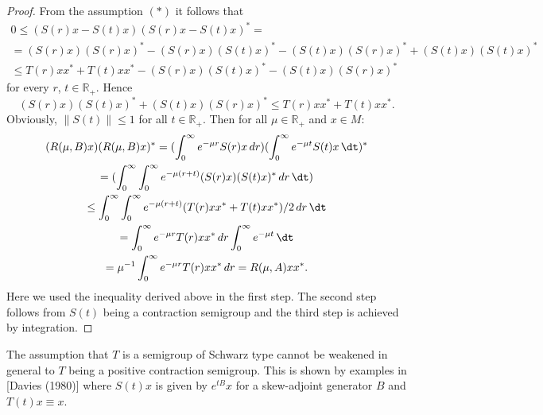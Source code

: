 \begin{proof}
From the assumption $ (*) $ it follows that
\begin{multline*}
	0 	\leq (S(r)x - S(t)x)(S(r)x - S(t)x)^{*} = \\
		 = (S(r)x)(S(r)x)^{*} - (S(r)x)(S(t)x)^{*} 
		 - (S(t)x)(S(r)x)^{*} + (S(t)x)(S(t)x)^{*}  \\
		 \leq T(r)xx^{*} + T(t)xx^{*} - (S(r)x)(S(t)x)^{*} -  
		   (S(t)x)(S(r)x)^{*}
\end{multline*}
for every $ r $, $ t \in \mathbb{R}_{+} $.
Hence
\[
	(S(r)x)(S(t)x)^{*} + (S(t)x)(S(r)x)^{*} \leq T(r)xx^{*} + T(t)xx^{*}.
\]
Obviously, $ \|S(t)\| \leq 1 $ for all $ t \in \mathbb{R}_{+} $.
Then for all $ \mu \in \mathbb{R}_{+} $ and $ x \in M $:
\begin{multline*}
	(R(\mu,B)x)(R(\mu,B)x)^{*} = (\int_{0}^\infty e^{-\mu r}S(r)x \, dr)(\int_{0}^\infty e^{-\mu t}S(t)x \, 				\dt)^{*}   \\
	= (\int_{0}^\infty \int_{0}^\infty e^{-\mu(r+t)} (S(r)x)(S(t)x)^{*} \, dr \, \dt) \\
	\leq \int_{0}^\infty \int_{0}^\infty e^{-\mu(r+t)} (T(r)xx^{*} + T(t)xx^{*})/2 \, dr \, \dt \\
	= \int_{0}^\infty e^{-\mu r} T(r)xx^{*} \, dr \int_{0}^\infty e^{-\mu t} \, \dt  \\
	= \mu^{-1} \int_{0}^\infty e^{-\mu r} T(r)xx^{*} \, dr = R(\mu,A)xx^{*}.
\end{multline*}
Here we used the inequality derived above in the first step.
The second step follows from $ S(t)$ being a contraction semigroup and the third step is achieved by integration.
\end{proof}

\begin{remark}
The assumption that $ T $ is a semigroup of Schwarz type cannot be weakened in general to $ T $ being a positive contraction semigroup.
This is shown by examples in [Davies (1980)] where $ S(t)x $ is given by $ e^{tB}x $ for a skew-adjoint generator $ B $ and $ T(t)x \equiv x $.
\end{remark}


